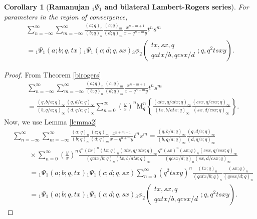 \documentclass[12pt]{article}
\newcommand{\M}{\mathrm{M}}
\newtheorem{corollary}{Corollary}
\begin{document}
\begin{corollary}[\bf Ramanujan ${}_{1}\Psi_{1}$ and bilateral Lambert-Rogers series]\label{coroBLR}
For parameters in the region of convergence,
\begin{multline}
    \sum_{n=-\infty}^{\infty}\sum_{m=-\infty}^{\infty}\frac{(a;q)_n}{(b;q)_n}\frac{(c;q)_m}{(d;q)_m}\frac{x^{n+m+1}}{x-q^{n+m}y}t^ns^m\\
    ={}_{1}\Psi_{1}(a;b;q,tx){}_{1}\Psi_{1}(c;d;q,sx){}_{3}\phi_{2}\left(
    \begin{array}{c}
         tx,sx,q \\
         qatx/b,qcsx/d
    \end{array}
    ;q,q^2tsxy
    \right).
\end{multline}
\end{corollary}
\begin{proof}
From Theorem \ref{birogers}
    \begin{align*}
        &\sum_{n=-\infty}^{\infty}\sum_{m=-\infty}^{\infty}\frac{(a;q)_n}{(b;q)_n}\frac{(c;q)_m}{(d;q)_m}\frac{x^{n+m+1}}{x-q^{n+m}y}t^ns^m\\
        &=\frac{(q,b/a;q)_{\infty}}{(b,q/a;q)_{\infty}}\frac{(q,d/c;q)_{\infty}}{(d,q/c;q)_{\infty}}\sum_{n=0}^{\infty}\left(\frac{y}{x}\right)^n\M_q^n\left\{\frac{(atx,q/atx;q)_{\infty}}{(tx,b/atx;q)_{\infty}}\frac{(csx,q/csx;q)_{\infty}}{(sx,d/csx;q)_{\infty}}\right\}.
    \end{align*}
Now, we use Lemma \ref{lemma2}    
\begin{align*}
    &\sum_{n=-\infty}^{\infty}\sum_{m=-\infty}^{\infty}\frac{(a;q)_n}{(b;q)_n}\frac{(c;q)_m}{(d;q)_m}\frac{x^{n+m+1}}{x-q^{n+m}y}t^ns^m=\frac{(q,b/a;q)_{\infty}}{(b,q/a;q)_{\infty}}\frac{(q,d/c;q)_{\infty}}{(d,q/c;q)_{\infty}}\\
    &\hspace{1cm}\times\sum_{n=0}^{\infty}\left(\frac{y}{x}\right)^n\frac{q^n(tx)^n(tx;q)_{n}(atx,q/atx;q)_{\infty}}{(qatx/b;q)_{n}(tx,b/atx;q)_{\infty}}\frac{q^n(sx)^n(sx;q)_{n}(csx,q/csx;q)_{\infty}}{(qcsx/d;q)_{n}(sx,d/csx;q)_{\infty}}\\
    &\hspace{1cm}={}_{1}\Psi_{1}(a;b;q,tx){}_{1}\Psi_{1}(c;d;q,sx)\sum_{n=0}^{\infty}\left(q^2tsxy\right)^n\frac{(tx;q)_{n}}{(qatx/b;q)_{n}}\frac{(sx;q)_{n}}{(qcsx/d;q)_{n}}\\
    &\hspace{1cm}={}_{1}\Psi_{1}(a;b;q,tx){}_{1}\Psi_{1}(c;d;q,sx){}_{3}\phi_{2}\left(
    \begin{array}{c}
         tx,sx,q \\
         qatx/b,qcsx/d
    \end{array}
    ;q,q^2tsxy
    \right).
\end{align*}  
\end{proof}
\end{document}
